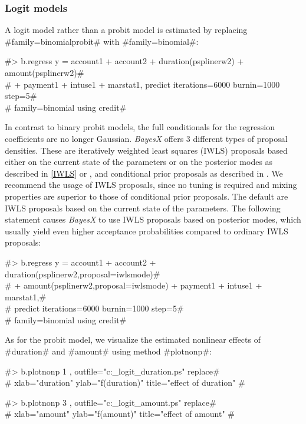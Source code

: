 \clearpage

\subsubsection{Logit models}

A logit model rather than a probit model is estimated by replacing
#family=binomialprobit# with #family=binomial#:

#> b.regress  y = account1 + account2 + duration(psplinerw2) + amount(psplinerw2)# \\
#  + payment1 + intuse1 + marstat1, predict iterations=6000 burnin=1000 step=5# \\
#  family=binomial using credit#

In contrast to binary probit models, the full conditionals for the
regression coefficients are no longer Gaussian. {\em BayesX} offers
3 different types of proposal densities. These are iteratively
weighted least squares (IWLS) proposals based either on the current
state of the parameters or on the posterior modes as described in
\autoref{IWLS} or , and conditional prior
proposals as described in . We recommend
the usage of IWLS proposals, since no tuning is required and mixing
properties are superior to those of conditional prior proposals. The
default are IWLS proposals based on the current state of the
parameters. The following statement causes {\em BayesX} to use IWLS
proposals based on posterior modes, which usually yield even higher
acceptance probabilities compared to ordinary IWLS proposals:

#> b.regress  y = account1 + account2 + duration(psplinerw2,proposal=iwlsmode)# \\
#  + amount(psplinerw2,proposal=iwlsmode) + payment1 + intuse1 + marstat1,# \\
#  predict iterations=6000 burnin=1000 step=5# \\
#  family=binomial using credit#

As for the probit model, we visualize the estimated nonlinear
effects of #duration# and #amount# using method #plotnonp#:

#> b.plotnonp 1 , outfile="c:\results\credit_logit_duration.ps" replace# \\
#  xlab="duration" ylab="f(duration)" title="effect of duration" #

#> b.plotnonp 3 , outfile="c:\results\credit_logit_amount.ps" replace# \\
#  xlab="amount" ylab="f(amount)" title="effect of amount" #

